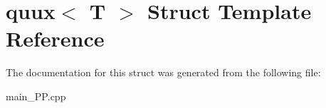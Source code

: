\hypertarget{structquux}{\section{quux$<$ T $>$ Struct Template Reference}
\label{structquux}
}


The documentation for this struct was generated from the following file\+:\begin{DoxyCompactItemize}
\item 
main\+\_\+\+P\+P.\+cpp\end{DoxyCompactItemize}
